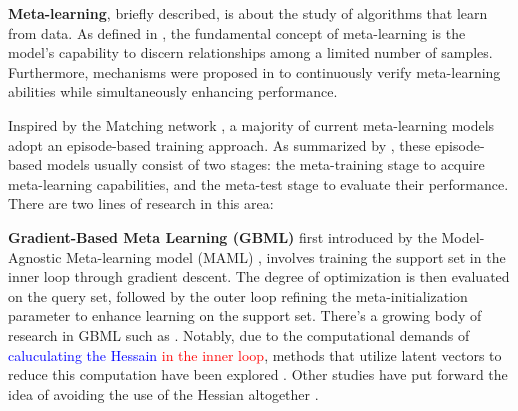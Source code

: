 \documentclass[letterpaper]{article} %
\newcommand{\nj}[1]{\textcolor{red}{#1}}
\newcommand{\jh}[1]{\textcolor{blue}{#1}}
\newcommand{\yr}[1]{\textcolor{magenta}{#1}}
\begin{document}
\textbf{Meta-learning}, briefly described, is about the study of algorithms that learn from data. As defined in \cite{labelequiv:metadefinition}, the fundamental concept of meta-learning is the model's capability to discern relationships among a limited number of samples.
Furthermore, mechanisms were proposed in \cite{label_equiv:matchingnetwork} to continuously verify meta-learning abilities while simultaneously enhancing performance.

Inspired by the Matching network \cite{label_equiv:matchingnetwork}, a majority of current meta-learning models adopt an episode-based training approach. As summarized by \citet{nonepisodic:transferminitocars}, these episode-based models usually consist of two stages: the meta-training stage to acquire meta-learning capabilities, and the meta-test stage to evaluate their performance. There are two lines of research in this area:

\textbf{Gradient-Based Meta Learning (GBML)} %
first introduced by the Model-Agnostic Meta-learning model (MAML) \cite{episodic:GBML:MAML}, involves training the support set in the inner loop through gradient descent. The degree of optimization is then evaluated on the query set, followed by the outer loop refining the meta-initialization parameter to enhance learning on the support set. %
There's a growing body of research in GBML
such as \cite{episodic:GBML:ANIL, episodic:GBML:imaml, episodic:GBML:warpgrad, episodic:GBML:Reptile}. Notably, due to the computational demands of \jh{caluculating the Hessain} \nj{in the inner loop}, %
methods that utilize latent vectors to reduce this computation %
have been explored \cite{episodic:GBML:LEO}. Other studies have put forward the idea of %
avoiding the use of the Hessian altogether \cite{episodic:GBML:ANIL, episodic:GBML:Reptile, episodic:GBML:MAML}.
\end{document}
